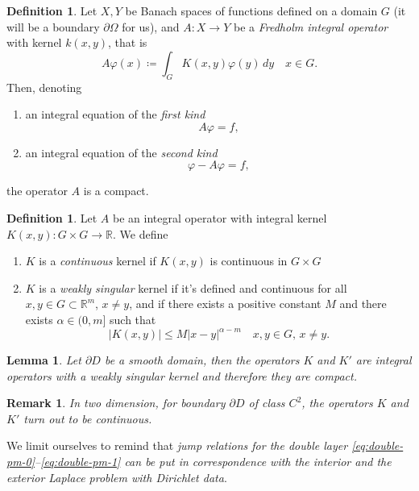 \documentclass[10pt, a4paper, twoside, openright]{book}
\theoremstyle{definition}
\newtheorem{definition}[subsection]{Definition}
\theoremstyle{plain}
\theoremstyle{plain}
\theoremstyle{plain}
\theoremstyle{plain}
\newtheorem{remark}[subsection]{Remark}
\theoremstyle{plain}
\newtheorem{lemma}[subsection]{Lemma}
\theoremstyle{plain}
\theoremstyle{plain}
\theoremstyle{plain}
\let\phi\varphi
\begin{document}
\begin{definition}
 Let $X,Y$ be Banach spaces of functions defined on a domain $G$ (it will be a boundary $\partial \Omega$ for us), and $A:X\to Y$ be a \emph{Fredholm integral operator} with kernel $k(x,y)$, that is
 \begin{equation}
  A\phi(x)\coloneqq\int_G K(x,y)\phi(y)\,dy\quad x\in G. \label{eq:def-integral-operator}
 \end{equation}
 Then, denoting
 \begin{enumerate}
  \item an integral equation of the \emph{first kind}
   \begin{equation}
    A\phi=f,
   \end{equation}
  \item an integral equation of the \emph{second kind}
   \begin{equation}
    \phi - A\phi=f,
   \end{equation}
 \end{enumerate}
the operator $A$ is a compact.
\end{definition}
\begin{definition}
 Let $A$ be an integral operator with integral kernel $K(x,y):G \times G \to\mathbb{R}$. We define
 \begin{enumerate}
  \item $K$ is a \emph{continuous} kernel if $K(x,y)$ is continuous in $G\times G$
  \item $K$ is a \emph{weakly singular} kernel if it's defined and continuous for all $x,y\in G\subset \mathbb{R}^m$, $x\neq y$, and if there exists a positive constant $M$ and 
  there exists $\alpha\in (0,m]$ such that
  \begin{equation}
   |K(x,y)|\leq M |x-y|^{\alpha-m}\quad x,y\in G, \, x\neq y.
  \end{equation}
 \end{enumerate}
\end{definition}
\begin{lemma}
\label{lemma:K-K'-compact}
 Let $\partial D$ be a smooth domain, then the operators $K$ and $K'$ are integral operators with a weakly singular kernel and therefore they are compact.
\end{lemma}
\begin{remark}
 In two dimension, for boundary $\partial D$ of class $C^2$, the operators $K$ and $K'$ turn out to be continuous.
\end{remark}
We limit ourselves to remind that \emph{jump relations for the double layer \eqref{eq:double-pm-0}--\eqref{eq:double-pm-1} can be put in correspondence with the interior and the exterior Laplace problem with Dirichlet data}.
\end{document}
